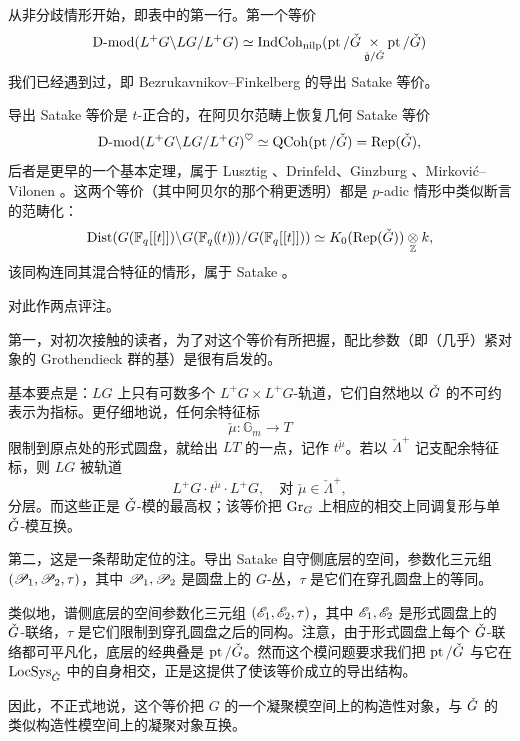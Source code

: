 \ssszh 从非分歧情形开始，即表中的第一行。第一个等价
\begin{equation}
\operatorname{D-mod}(L^+G \backslash LG / L^+G) \simeq \operatorname{IndCoh}_{\operatorname{nilp}}( \operatorname{pt} / \check{G} \underset {\check{\mathfrak{g}}/\check{G}}
\times \operatorname{pt} / \check{G})
\end{equation}
我们已经遇到过，即 Bezrukavnikov--Finkelberg \cite{bezfinksat} 的导出 Satake 等价。

导出 Satake 等价是 $t$-正合的，在阿贝尔范畴上恢复几何 Satake 等价
\[
 \operatorname{D-mod}(L^+G \backslash LG / L^+G)^\heartsuit \simeq \operatorname{QCoh}(\operatorname{pt} / \check{G}) =
 \operatorname{Rep}(\check{G}),
\]
后者是更早的一个基本定理，属于 Lusztig \cite{lusztigqchar}、Drinfeld、Ginzburg \cite{ginzburgsatake}、Mirković--Vilonen \cite{mirkovic-vilonen}。这两个等价（其中阿贝尔的那个稍更透明）都是 $p$-adic 情形中类似断言的范畴化：
\[
   \operatorname{Dist}( G(\mathbb{F}_q[[t]]) \backslash G(\mathbb{F}_q(\!(t)\!)) / G(\mathbb{F}_q[[t]])) \simeq K_0(
   \operatorname{Rep}(\check{G})) \underset{\mathbb{Z}}{\otimes} k,
\]
该同构连同其混合特征的情形，属于 Satake \cite{satake63}。

对此作两点评注。

\begin{re} \label{r:paramcount} 第一，对初次接触的读者，为了对这个等价有所把握，配比参数（即（几乎）紧对象的 Grothendieck 群的基）是很有启发的。

基本要点是：$LG$ 上只有可数多个 $L^+G \times L^+G$-轨道，它们自然地以 $\check{G}$ 的不可约表示为指标。更仔细地说，任何余特征标
\[
   \check{\mu}: \mathbb{G}_m \rightarrow T
\]
限制到原点处的形式圆盘，就给出 $LT$ 的一点，记作 $t^{\check{\mu}}$。若以 $\check{\Lambda}^+$ 记支配余特征标，则 $LG$ 被轨道
\[
   L^+G \cdot t^{\check{\mu}} \cdot L^+G, \quad \text{对 } \check{\mu} \in
   \check{\Lambda}^+,
\]
分层。而这些正是 $\check{G}$-模的最高权；该等价把 $\operatorname{Gr}_G$ 上相应的相交上同调复形与单 $\check{G}$-模互换。\end{re}

\begin{re} 第二，这是一条帮助定位的注。导出 Satake 自守侧底层的空间，参数化三元组 $(\mathscr{P}_1, \mathscr{P}_2, \tau)$，其中 $\mathscr{P}_1, \mathscr{P}_2$ 是圆盘上的 $G$-丛，$\tau$ 是它们在穿孔圆盘上的等同。

类似地，谱侧底层的空间参数化三元组 $(\mathscr{E}_1, \mathscr{E}_2, \tau)$，其中 $\mathscr{E}_1, \mathscr{E}_2$ 是形式圆盘上的 $\check{G}$-联络，$\tau$ 是它们限制到穿孔圆盘之后的同构。注意，由于形式圆盘上每个 $\check{G}$-联络都可平凡化，底层的经典叠是 $\operatorname{pt} / \check{G}$。然而这个模问题要求我们把 $\operatorname{pt}/\check{G}$ 与它在 $\operatorname{LocSys}_{\check{G}}$ 中的自身相交，正是这提供了使该等价成立的导出结构。

因此，不正式地说，这个等价把 $G$ 的一个凝聚模空间上的构造性对象，与 $\check{G}$ 的类似构造性模空间上的凝聚对象互换。
\end{re}


